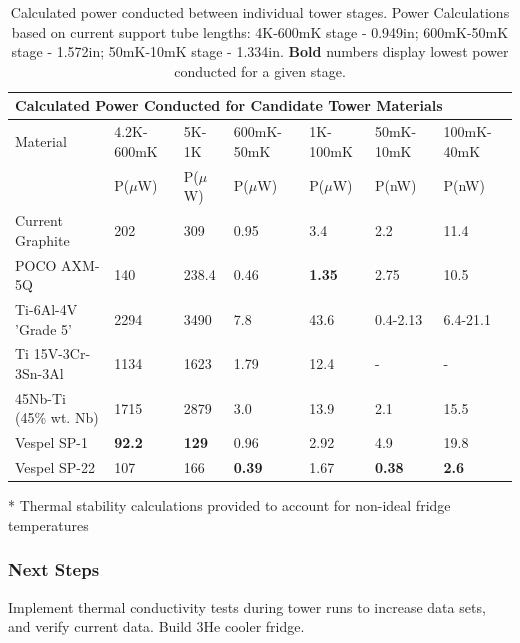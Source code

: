 \documentclass{report}
\begin{document}
\begin{table}[htb]
\begin{threeparttable}
{\footnotesize\rm\begin{tabularx}{17.7cm}{l|XXXXXX}
  \multicolumn{7}{l}{{\large Calculated Power Conducted for Candidate Tower Materials}}\\
\toprule
 {\normalsize Material} & 4.2K-600mK  &5K-1K\tnote{*}& 600mK-50mK & 1K-100mK\tnote{*} & 50mK-10mK & 100mK-40mK\tnote{*} \\
  &P($\mu$W)&P($\mu$W)&P($\mu$W)&P($\mu$W)& P(nW) & P(nW) \\ \hline\hline
  Current Graphite & 202 & 309 & 0.95 & 3.4 & 2.2 & 11.4 \\
  POCO AXM-5Q & 140 & 238.4 & 0.46 & \textbf{1.35} & 2.75 & 10.5 \\
  Ti-6Al-4V 'Grade 5' & 2294 & 3490 & 7.8 & 43.6 & 0.4-2.13 & 6.4-21.1 \\
  Ti 15V-3Cr-3Sn-3Al & 1134 & 1623 & 1.79 & 12.4 & - & - \\
  45Nb-Ti (45\% wt. Nb) & 1715 & 2879 & 3.0 & 13.9 & 2.1 & 15.5 \\
  Vespel SP-1 & \textbf{92.2} & \textbf{129} & 0.96 & 2.92 & 4.9 & 19.8 \\
  Vespel SP-22 & 107 & 166 & \textbf{0.39} & 1.67 & \textbf{0.38} & \textbf{2.6} \\
\bottomrule
\end{tabularx}
\begin{tablenotes}
   \item[*]{Thermal stability calculations provided to account for non-ideal fridge temperatures}
\end{tablenotes}}
\caption{Calculated power conducted between individual tower stages. Power Calculations
based on current support tube lengths: 4K-600mK stage - 0.949in; 600mK-50mK stage - 1.572in;
50mK-10mK stage - 1.334in. \textbf{Bold} numbers display lowest power conducted for a given
stage.}
\end{threeparttable}
\end{table}

\subsubsection{Next Steps}

Implement thermal conductivity tests during tower runs to increase data sets, and verify
current data. Build 3He cooler fridge.
\end{document}
